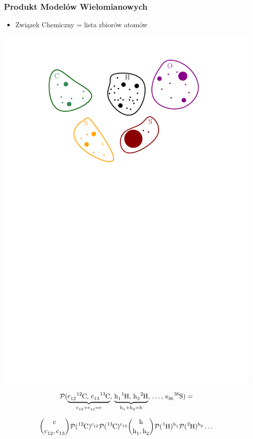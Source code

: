 \documentclass[xetex]{beamer}
\begin{document}
	\begin{frame}\frametitle{{\color{gray}Produkt} Model{\color{gray}ów} Wielomianowy{\color{gray}ch}}
			
		\begin{itemize}
			\item Związek Chemiczny = lista zbiorów atomów 

		\end{itemize}
		\begin{center}
			\includegraphics[height=.4\textheight, keepaspectratio]{./picts/molecule.pdf}
		\end{center}

		$$ \prob( 
			\underbrace{\cem{c_{12}} \cem{^{12}C},\, \cem{c_{13}} \cem{^{13}C}}_{\cem{c_{12}}+ \cem{c_{13}} = \cem{c}},\,
			\underbrace{\cem{h_1} \cem{^{1}H},\,\cem{h_2} \cem{^{2}H}}_{\cem{h_1} + \cem{h_2} = \cem{h}}, 
			\,\dots,\, 
			\cem{s_{36}} \cem{^{36}S} ) 
			= 
			$$

		$$ 	{\cem{c} \choose \cem{c_{12}},\cem{c_{13}} }
			\prob(\cem{^{12}C})^{\cem{c_{12}}} \prob(\cem{^{13}C})^{\cem{c_{13}}} 
			{\cem{h} \choose \cem{h_{1}},\cem{h_{2}} }
			\prob(\cem{^{1}H})^{\cem{h_1}} \prob(\cem{^{2}H})^{\cem{h_2}}
			\dots $$	

	\end{frame}
\end{document}
